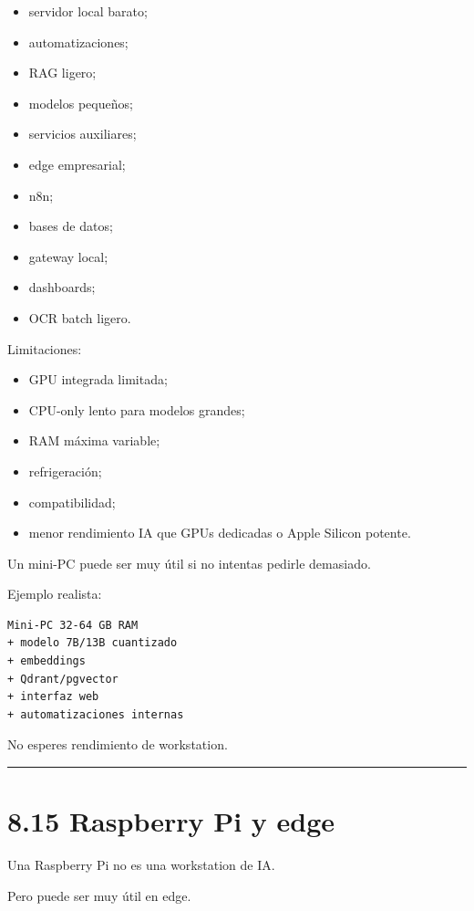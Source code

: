 \begin{itemize}
\tightlist
\item
  servidor local barato;
\item
  automatizaciones;
\item
  RAG ligero;
\item
  modelos pequeños;
\item
  servicios auxiliares;
\item
  edge empresarial;
\item
  n8n;
\item
  bases de datos;
\item
  gateway local;
\item
  dashboards;
\item
  OCR batch ligero.
\end{itemize}

Limitaciones:

\begin{itemize}
\tightlist
\item
  GPU integrada limitada;
\item
  CPU-only lento para modelos grandes;
\item
  RAM máxima variable;
\item
  refrigeración;
\item
  compatibilidad;
\item
  menor rendimiento IA que GPUs dedicadas o Apple Silicon potente.
\end{itemize}

Un mini-PC puede ser muy útil si no intentas pedirle demasiado.

Ejemplo realista:

\begin{lstlisting}
Mini-PC 32-64 GB RAM
+ modelo 7B/13B cuantizado
+ embeddings
+ Qdrant/pgvector
+ interfaz web
+ automatizaciones internas
\end{lstlisting}

No esperes rendimiento de workstation.

\begin{center}\rule{0.5\linewidth}{0.5pt}\end{center}

\section{8.15 Raspberry Pi y edge}\label{raspberry-pi-y-edge}

Una Raspberry Pi no es una workstation de IA.

Pero puede ser muy útil en edge.

